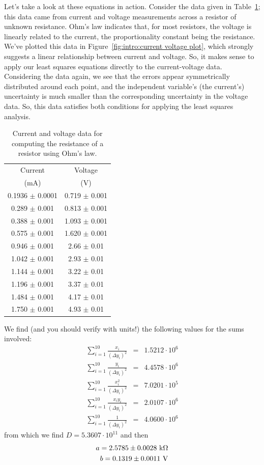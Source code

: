 Let's take a look at these equations in action. Consider the data given in 
Table~\ref{tab:intro:current voltage data}; this data came from current and 
voltage measurements across a resistor of unknown resistance. Ohm's law 
indicates that, for most resistors, the voltage is linearly related to the 
current, the proportionality constant being the resistance. We've plotted this 
data in Figure~\ref{fig:intro:current voltage plot}, which strongly suggests a 
linear relationship between current and voltage. So, it makes sense to apply 
our least squares equations directly to the current-voltage data. Considering 
the data again, we see that the errors appear symmetrically distributed around 
each point, and the independent variable's (the current's) uncertainty is much 
smaller than the corresponding uncertainty in the voltage data. So, this data 
satisfies both conditions for applying the least squares analysis.
\begin{table}[htb]
\begin{center}
\begin{tabular}{c|c}
Current & Voltage\\
(mA) & (V)\\
\hline
0.1936 $\pm$ 0.0001 & 0.719 $\pm$ 0.001\\
0.289 $\pm$ 0.001 & 0.813 $\pm$ 0.001\\
0.388 $\pm$ 0.001 & 1.093 $\pm$ 0.001\\
0.575 $\pm$ 0.001 & 1.620 $\pm$ 0.001\\
0.946 $\pm$ 0.001 & 2.66 $\pm$ 0.01\\
1.042 $\pm$ 0.001 & 2.93 $\pm$ 0.01\\
1.144 $\pm$ 0.001 & 3.22 $\pm$ 0.01\\
1.196 $\pm$ 0.001 & 3.37 $\pm$ 0.01\\
1.484 $\pm$ 0.001 & 4.17 $\pm$ 0.01\\
1.750 $\pm$ 0.001 & 4.93 $\pm$ 0.01\\
\end{tabular}
\end{center}
\caption{Current and voltage data for computing the resistance of a resistor using Ohm's law.}
\label{tab:intro:current voltage data}
\end{table}

We find (and you should verify with units!) the following values for the sums 
involved:
\begin{eqnarray*}
\sum^{10}_{i=1} \frac{x_i}{(\Delta y_i)^2} & = & 1.5212 \cdot 10^6\\
\sum^{10}_{i=1} \frac{y_i}{(\Delta y_i)^2} & = & 4.4578 \cdot 10^6\\
\sum^{10}_{i=1} \frac{x_i^2}{(\Delta y_i)^2} & = & 7.0201 \cdot 10^5\\
\sum^{10}_{i=1} \frac{x_i y_i}{(\Delta y_i)^2} & = & 2.0107 \cdot 10^6\\
\sum^{10}_{i=1} \frac{1}{(\Delta y_i)^2} & = & 4.0600 \cdot 10 ^6
\end{eqnarray*}
from which we find $D = 5.3607 \cdot 10 ^{11}$ and then
\begin{eqnarray*}
a = 2.5785 \pm 0.0028~{\rm k}\Omega\\
b = 0.1319 \pm 0.0011~{\rm V}
\end{eqnarray*}

